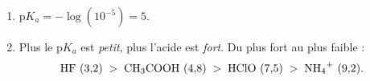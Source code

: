 \documentclass[11pt,a4paper]{article}
\begin{document}
\begin{corrige}
\begin{enumerate}[label=\alph*)]
  \item $\mathrm{p}K_a = -\log(10^{-5}) = 5$.
  \item Plus le $\mathrm{p}K_a$ est \emph{petit}, plus l'acide est \emph{fort}. Du plus fort au plus faible :
        \[ \ce{HF}\ (3{,}2) \;>\; \ce{CH3COOH}\ (4{,}8) \;>\; \ce{HClO}\ (7{,}5) \;>\; \ce{NH4+}\ (9{,}2). \]
\end{enumerate}
\end{corrige}
\end{document}
